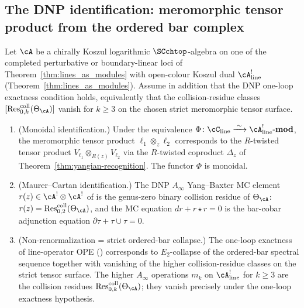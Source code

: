 \subsection{The DNP identification: meromorphic tensor product
from the ordered bar complex}
\label{subsec:dnp-identification}

\begin{theorem}[DNP line-operator package = bar-cobar twisting package]
\label{thm:dnp-bar-cobar-identification}
Let\/ $\cA$ be a chirally Koszul logarithmic $\SCchtop$-algebra on
one of the completed perturbative or boundary-linear loci of
Theorem~\ref{thm:lines_as_modules}
with open-colour Koszul dual\/ $\cA^!_{\mathrm{line}}$
\textup{(}Theorem~\textup{\ref{thm:lines_as_modules})}. Assume in
addition that the DNP one-loop exactness condition holds, equivalently
that the collision-residue classes
$[\operatorname{Res}^{\mathrm{coll}}_{0,k}(\Theta_\cA)]$ vanish for
$k\ge3$ on the chosen strict meromorphic tensor surface.
\begin{enumerate}[label=\textup{(\roman*)}]
\item \textup{(Monoidal identification.)}
 Under the equivalence\/
 $\Phi\colon \cC_{\mathrm{line}} \xrightarrow{\;\sim\;}
 \cA^!_{\mathrm{line}}\text{-}\mathbf{mod}$,
 the meromorphic tensor product\/ $\ell_1\otimes_z\ell_2$
 corresponds to the $R$-twisted tensor product
 $V_{\ell_1}\otimes_{R(z)}V_{\ell_2}$
 via the $R$-twisted coproduct $\Delta_z$ of\/
 Theorem~\textup{\ref{thm:yangian-recognition}}.
 The functor $\Phi$ is monoidal.
\item \textup{(Maurer--Cartan identification.)}
 The DNP $A_\infty$ Yang--Baxter MC element
 $r(z)\in\cA^!\otimes\cA^!$
 of\/ \textup{\cite{DNP25}} is the genus-zero binary collision
 residue of\/ $\Theta_\cA$:
 $r(z) = \operatorname{Res}^{\mathrm{coll}}_{0,2}(\Theta_\cA)$,
 and the MC equation $dr + r\star r = 0$ is the bar-cobar
 adjunction equation $\partial\tau + \tau\cup\tau = 0$.
\item \textup{(Non-renormalization = strict ordered-bar collapse.)}
 The one-loop exactness of line-operator OPE
 \textup{(\cite[Thm.\,4.1]{DNP25})} corresponds to
 $E_2$-collapse of the ordered-bar spectral sequence together with
 vanishing of the higher collision-residue classes on the strict
 tensor surface.
 The higher $A_\infty$ operations\/ $m_k$ on\/
 $\cA^!_{\mathrm{line}}$ for $k\geq 3$ are the collision
 residues $\operatorname{Res}^{\mathrm{coll}}_{0,k}(\Theta_\cA)$;
 they vanish precisely under the one-loop exactness hypothesis.
\end{enumerate}
\end{theorem}

